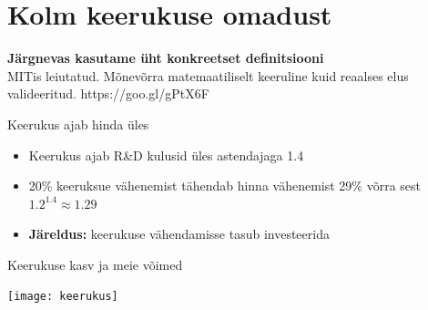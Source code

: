 \documentclass{beamer}
\begin{document}
\section{Kolm keerukuse omadust}
\begin{frame}[fragile]
	\begin{center}
		\LARGE{\textbf{Järgnevas kasutame üht konkreetset definitsiooni}}
		\\[4cm]
		\small{MITis leiutatud. Mõnevõrra matemaatiliselt keeruline kuid reaalses elus valideeritud. https://goo.gl/gPtX6F}
	\end{center}
\end{frame}

\begin{frame}{Keerukus ajab hinda üles}
	\begin{itemize}
		\item Keerukus ajab R\&D kulusid üles astendajaga 1.4
		\item 20\% keeruksue vähenemist tähendab hinna vähenemist 29\% võrra sest $1.2^{1.4}\approx1.29$
		\item \textbf{Järeldus:} keerukuse vähendamisse tasub investeerida
	\end{itemize}
\end{frame}

{
\begin{frame}[plain]
\end{frame}
}

\begin{frame}{Keerukuse kasv ja meie võimed}
	\begin{center}
		\texttt{[image: keerukus]}
	\end{center}
\end{frame}
\end{document}
